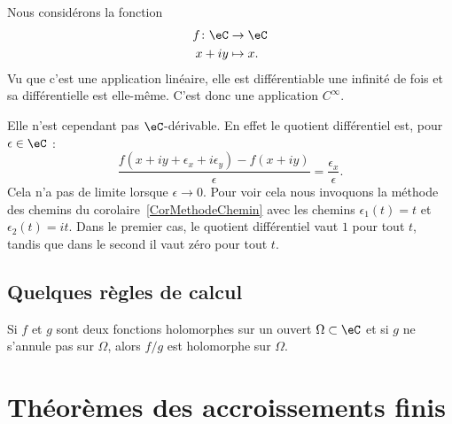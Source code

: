 \begin{example}
	Nous considérons la fonction
	\begin{equation}
		\begin{aligned}
			f\colon \eC & \to \eC    \\
			x+iy        & \mapsto x.
		\end{aligned}
	\end{equation}
	Vu que c'est une application linéaire, elle est différentiable une infinité de fois et sa différentielle est elle-même. C'est donc une application \( C^{\infty}\).

	Elle n'est cependant pas \( \eC\)-dérivable. En effet le quotient différentiel est, pour \( \epsilon\in \eC\) :
	\begin{equation}
		\frac{ f(x+iy+\epsilon_x+i\epsilon_y)-f(x+iy) }{ \epsilon }=\frac{ \epsilon_x }{ \epsilon }.
	\end{equation}
	Cela n'a pas de limite lorsque \( \epsilon\to 0\). Pour voir cela nous invoquons la méthode des chemins du corolaire~\ref{CorMethodeChemin} avec les chemins \( \epsilon_1(t)=t\) et \( \epsilon_2(t)=it\). Dans le premier cas, le quotient différentiel vaut \( 1\) pour tout \( t\), tandis que dans le second il vaut zéro pour tout \( t\).
\end{example}

\subsection{Quelques règles de calcul}

\begin{lemma}       \label{LEMooVDXOooUyFHXZ}
	Si \( f\) et \( g\) sont deux fonctions holomorphes sur un ouvert \( \Omega\subset \eC\) et si \( g\) ne s'annule pas sur \( \Omega\), alors \( f/g\) est holomorphe sur \( \Omega\).
\end{lemma}


\section{Théorèmes des accroissements finis}		\label{SecThoAccrsFinis}

